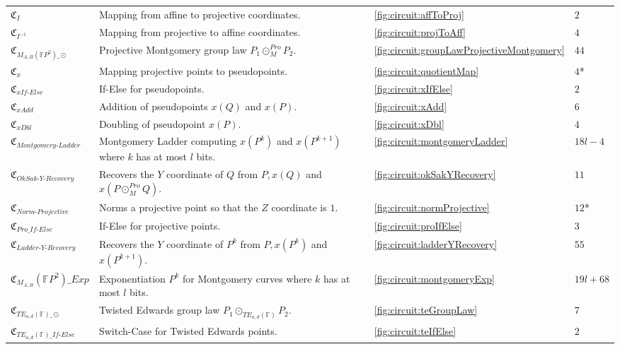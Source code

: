 \begin{longtable}{|L{4cm}|L{5.5cm}|L{1.3cm}|L{3cm}|}
    $\mathfrak{C}_{I}$ & Mapping from affine to projective coordinates. & \cref{fig:circuit:affToProj} & $2$\\
    $\mathfrak{C}_{{I^{-1}}}$ & Mapping from projective to affine coordinates. & \cref{fig:circuit:projToAff} & $4$\\
    $\mathfrak{C}_{M_{A,B}(\mathbb{F}P^2)\_\odot}$ & Projective Montgomery group law $P_1\odot_M^{Pro} P_2$. & \cref{fig:circuit:groupLawProjectiveMontgomery} & $44$ \\
    $\mathfrak{C}_{x}$ & Mapping projective points to pseudopoints. & \cref{fig:circuit:quotientMap} & $4$*\\
    $\mathfrak{C}_{{xIf\text{-}Else}}$ & If-Else for pseudopoints. & \cref{fig:circuit:xIfElse} & $2$\\
    $\mathfrak{C}_{xAdd}$ & Addition of pseudopoints $x(Q)$ and $x(P)$. & \cref{fig:circuit:xAdd} & $6$\\
    $\mathfrak{C}_{xDbl}$ & Doubling of pseudopoint $x(P)$. & \cref{fig:circuit:xDbl} & $4$\\
    $\mathfrak{C}_{Montgomery\text{-}Ladder}$ & Montgomery Ladder computing $x(P^k)$ and $x(P^{k+1})$ where $k$ has at most $l$ bits. & \cref{fig:circuit:montgomeryLadder} & $18l-4$\\
    $\mathfrak{C}_{OkSak\text{-}Y\text{-}Recovery}$ & Recovers the $Y$ coordinate of $Q$ from $P, x(Q)$ and $x(P\odot_M^{Pro}Q)$. & \cref{fig:circuit:okSakYRecovery} & $11$\\
    $\mathfrak{C}_{Norm\text{-}Projective}$ & Norms a projective point so that the $Z$ coordinate is $1$. & \cref{fig:circuit:normProjective} & $12$* \\
    $\mathfrak{C}_{Pro\_If\text{-}Else}$ & If-Else for projective points. & \cref{fig:circuit:proIfElse} & $3$\\
    $\mathfrak{C}_{Ladder\text{-}Y\text{-}Recovery}$ & Recovers the $Y$ coordinate of $P^k$ from $P, x(P^k)$ and $x(P^{k+1})$. & \cref{fig:circuit:ladderYRecovery} & $55$\\
    $\mathfrak{C}_{M_{A, B}}(\mathbb{F}P^2)\_Exp$ & Exponentiation $P^k$ for Montgomery curves where $k$ has at most $l$ bits. & \cref{fig:circuit:montgomeryExp} & $19l+68$\\
    \hline
    $\mathfrak{C}_{TE_{a,d}(\mathbb{F})\_\odot}$ & Twisted Edwards group law $P_1\odot_{TE_{a,d}(\mathbb{F})}P_2$. & \cref{fig:circuit:teGroupLaw} & $7$\\
    $\mathfrak{C}_{TE_{a,d}(\mathbb{F})\_If\text{-}Else}$ & Switch-Case for Twisted Edwards points. & \cref{fig:circuit:teIfElse} & $2$\\

\end{longtable}
